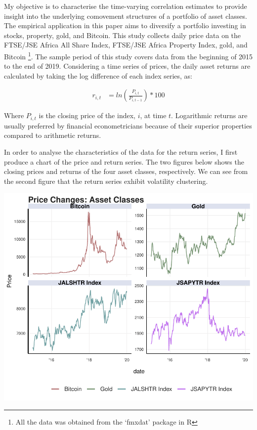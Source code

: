 \documentclass[11pt,preprint, authoryear]{elsarticle}
\numberwithin{equation}{section}
\numberwithin{figure}{section}
\numberwithin{table}{section}
\let\rmarkdownfootnote\footnote%
\def\footnote{\protect\rmarkdownfootnote}
\begin{document}
My objective is to characterise the time-varying correlation estimates
to provide insight into the underlying comovement structures of a
portfolio of asset classes. The empirical application in this paper aims
to diversify a portfolio investing in stocks, property, gold, and
Bitcoin. This study collects daily price data on the FTSE/JSE Africa All
Share Index, FTSE/JSE Africa Property Index, gold, and Bitcoin
\footnote{All the data was obtained from the `fmxdat' package in R}. The
sample period of this study covers data from the beginning of 2015 to
the end of 2019. Considering a time series of prices, the daily asset
returns are calculated by taking the log difference of each index
series, as:

\begin{align} 
  r_{i,t} &= ln(\frac{P_{i,t}}{P_{i,t-1}}) * 100
\end{align}

Where \(P_{i,t}\) is the closing price of the index, \(i\), at time
\(t\). Logarithmic returns are usually preferred by financial
econometricians because of their superior properties compared to
arithmetic returns.

In order to analyse the characteristics of the data for the return
series, I first produce a chart of the price and return series. The two
figures below shows the closing prices and returns of the four asset
classes, respectively. We can see from the second figure that the return
series exhibit volatility clustering.

\includegraphics{FinMetrics-Essay_files/figure-latex/unnamed-chunk-1-1.pdf}
\end{document}
